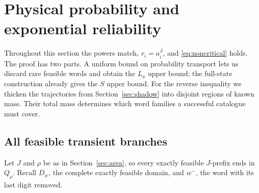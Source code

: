 \documentclass[11pt]{amsart}
\theoremstyle{definition}
\theoremstyle{remark}
\numberwithin{equation}{section}
\begin{document}
\section{Physical probability and exponential reliability}
\label{sec:reliability}
Throughout this section the powers match, $r_i=a_i^\beta$, and
\eqref{eq:noncritical} holds. The proof has two parts. A uniform
bound on probability transport lets us discard rare feasible words
and obtain the $L_a$ upper bound; the full-state construction already
gives the $S$ upper bound. For the reverse inequality we thicken the
trajectories from Section~\ref{sec:shadow} into disjoint regions of
known mass. Their total mass determines which word families a
successful catalogue must cover.

\subsection{All feasible transient branches}
Let $J$ and $\rho$ be as in Section~\ref{sec:area}, so every
exactly feasible $J$-prefix ends in $Q_\rho$.
Recall $D_w$, the complete exactly feasible domain, and $w^-$,
the word with its last digit removed.
\end{document}

